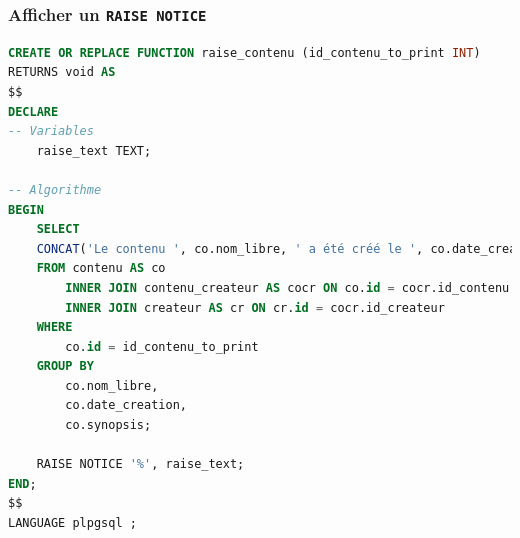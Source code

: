 \subsubsection{Afficher un \texttt{RAISE NOTICE}}
\begin{lstlisting}[language=SQL]
CREATE OR REPLACE FUNCTION raise_contenu (id_contenu_to_print INT)
RETURNS void AS
$$
DECLARE
-- Variables
	raise_text TEXT;

-- Algorithme
BEGIN
	SELECT
	CONCAT('Le contenu ', co.nom_libre, ' a été créé le ', co.date_creation, ' par ', STRING_AGG(cr.nom_libre, ', '), '. Voici son synopsis : ', co.synopsis) INTO raise_text
	FROM contenu AS co
		INNER JOIN contenu_createur AS cocr ON co.id = cocr.id_contenu
		INNER JOIN createur AS cr ON cr.id = cocr.id_createur
	WHERE
		co.id = id_contenu_to_print
	GROUP BY
		co.nom_libre,
		co.date_creation,
		co.synopsis;
	
	RAISE NOTICE '%', raise_text;
END;
$$
LANGUAGE plpgsql ;
\end{lstlisting}

